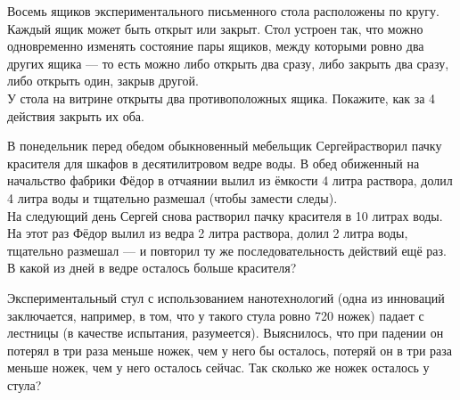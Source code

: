 ﻿
\begin{enumerate}

\itA Восемь ящиков экспериментального письменного стола расположены по кругу. Каждый ящик может быть открыт или закрыт. Стол устроен так, что можно одновременно изменять состояние пары ящиков, между которыми ровно два других ящика — то есть можно либо открыть два сразу, либо закрыть два сразу, либо открыть один, закрыв другой. \smallskip \\
У стола на витрине открыты два противоположных ящика. Покажите, как за 4 действия закрыть их оба.

\itB В понедельник перед обедом обыкновенный мебельщик Сергей\linebreak растворил пачку красителя для шкафов в десятилитровом ведре воды. В обед обиженный на начальство фабрики Фёдор в отчаянии вылил из ёмкости 4 литра раствора, долил 4 литра воды и тщательно размешал (чтобы замести следы). \smallskip \\
На следующий день Сергей снова растворил пачку красителя в 10 литрах воды. На этот раз Фёдор вылил из ведра 2 литра раствора, долил 2 литра воды, тщательно размешал — и повторил ту же последовательность действий ещё раз. В какой из дней в ведре осталось больше красителя?

\itC Экспериментальный стул с использованием нанотехнологий (одна из инноваций заключается, например, в том, что у такого стула ровно 720 ножек) падает с лестницы (в качестве испытания, разумеется). Выяснилось, что при падении он потерял в три раза меньше ножек, чем у него бы осталось, потеряй он в три раза меньше ножек, чем у него осталось сейчас. Так сколько же ножек осталось у стула?
\end{enumerate}